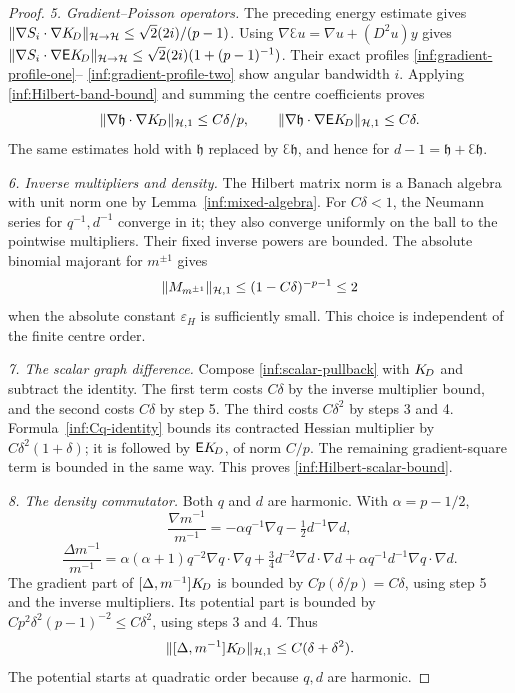 \begin{proof}
\emph{5. Gradient--Poisson operators.}
The preceding energy estimate gives
$\lVert \nabla S_i\cdot\nabla K_{\!D}\rVert_{\mathcal{H}\to\mathcal{H}}
\le\sqrt2(2i)/(p-1)$.
Using $\nabla\Euler u=\nabla u+(D^2u)y$ gives
$\lVert \nabla S_i\cdot\nabla\mathsf EK_{\!D}\rVert_{\mathcal{H}\to\mathcal{H}}
\le\sqrt2(2i)(1+(p-1)^{-1})$.
Their exact profiles \eqref{inf:gradient-profile-one}--
\eqref{inf:gradient-profile-two} show angular bandwidth $i$.
Applying \eqref{inf:Hilbert-band-bound} and summing the centre
coefficients proves
\[
 \lVert \nabla\mathfrak h\cdot\nabla K_{\!D}\rVert_{\mathcal{H},1}\le C\delta/p,
 \qquad
 \lVert \nabla\mathfrak h\cdot\nabla\mathsf EK_{\!D}\rVert_{\mathcal{H},1}\le C\delta.
\]
The same estimates hold with $\mathfrak h$ replaced by
$\Euler\mathfrak h$, and hence for
$d-1=\mathfrak h+\Euler\mathfrak h$.

\emph{6. Inverse multipliers and density.}
The Hilbert matrix norm is a Banach algebra with unit norm one
by Lemma~\ref{inf:mixed-algebra}.
For $C\delta<1$, the Neumann series for $q^{-1},d^{-1}$
converge in it; they also converge uniformly on the ball to the
pointwise multipliers. Their fixed inverse powers are bounded.
The absolute binomial majorant for $m^{\pm1}$ gives
\begin{equation}\label{inf:Hilbert-density-size}
 \lVert M_{m^{\pm1}}\rVert_{\mathcal{H},1}
 \le(1-C\delta)^{-p-1}\le2
\end{equation}
when the absolute constant $\varepsilon_H$ is sufficiently small.
This choice is independent of the finite centre order.

\emph{7. The scalar graph difference.}
Compose \eqref{inf:scalar-pullback} with $K_{\!D}$ and subtract
the identity. The first term costs $C\delta$ by the inverse
multiplier bound, and the second costs $C\delta$ by step 5.
The third costs $C\delta^2$ by steps 3 and 4.
Formula~\eqref{inf:Cq-identity} bounds its contracted Hessian
multiplier by $C\delta^2(1+\delta)$; it is followed by
$\mathsf EK_{\!D}$, of norm $C/p$. The remaining gradient-square
term is bounded in the same way. This proves
\eqref{inf:Hilbert-scalar-bound}.

\emph{8. The density commutator.}
Both $q$ and $d$ are harmonic. With $\alpha=p-1/2$,
\[
 \frac{\nabla m^{-1}}{m^{-1}}
 =-\alpha q^{-1}\nabla q-\tfrac12d^{-1}\nabla d,
\]
\[
 \frac{\Delta m^{-1}}{m^{-1}}
 =\alpha(\alpha+1)q^{-2}\nabla q\cdot\nabla q
 +\tfrac34d^{-2}\nabla d\cdot\nabla d
 +\alpha q^{-1}d^{-1}\nabla q\cdot\nabla d.
\]
The gradient part of $[\Delta,m^{-1}]K_{\!D}$ is bounded by
$Cp(\delta/p)=C\delta$, using step 5 and the inverse multipliers.
Its potential part is bounded by
$Cp^2\delta^2(p-1)^{-2}\le C\delta^2$, using steps 3 and 4.
Thus
\begin{equation}\label{inf:Hilbert-commutator}
 \lVert [\Delta,m^{-1}]K_{\!D}\rVert_{\mathcal{H},1}
 \le C(\delta+\delta^2).
\end{equation}
The potential starts at quadratic order because $q,d$ are harmonic.


\end{proof}
